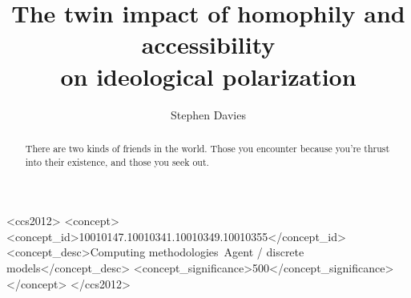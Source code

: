 \documentclass[sigconf]{acmart}
\begin{document}
\title{The twin impact of homophily and accessibility\\on ideological
polarization}


\author{Stephen Davies}

\renewcommand{\shortauthors}{S. Davies}


\begin{abstract}
There are two kinds of friends in the world. Those you encounter because
you're thrust into their existence, and those you seek out.
\end{abstract}

%
%
\begin{CCSXML}
<ccs2012>
<concept>
<concept_id>10010147.10010341.10010349.10010355</concept_id>
<concept_desc>Computing methodologies~Agent / discrete models</concept_desc>
<concept_significance>500</concept_significance>
</concept>
</ccs2012>
\end{CCSXML}





\maketitle



\appendix



\end{document}
